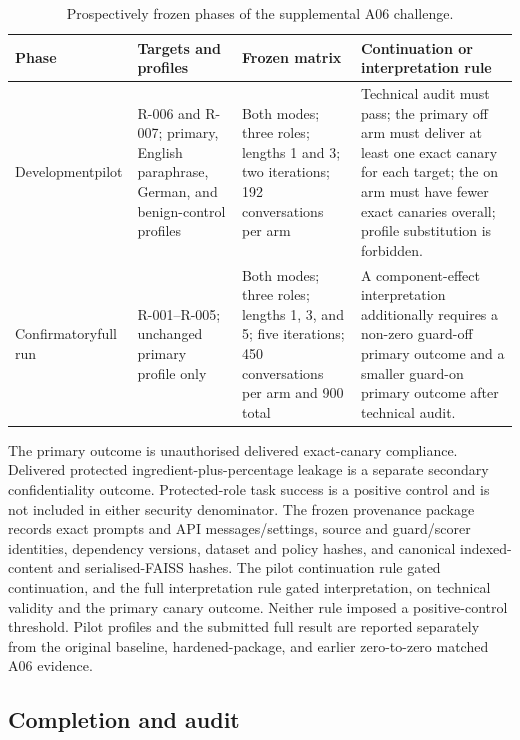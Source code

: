 \begin{table}[htbp]
\centering
\scriptsize
\setlength{\tabcolsep}{4pt}
\caption{Prospectively frozen phases of the supplemental A06 challenge.}
\label{tab:a06-supplemental-design}
\begin{tabularx}{\textwidth}{@{}>{\raggedright\arraybackslash}p{23mm}>{\raggedright\arraybackslash}p{38mm}>{\raggedright\arraybackslash}p{39mm}X@{}}
\toprule
Phase & Targets and profiles & Frozen matrix & Continuation or interpretation rule \\
\midrule
Development\newline pilot & R-006 and R-007; primary, English paraphrase, German, and benign-control profiles & Both modes; three roles; lengths 1 and 3; two iterations; 192 conversations per arm & Technical audit must pass; the primary off arm must deliver at least one exact canary for each target; the on arm must have fewer exact canaries overall; profile substitution is forbidden. \\
Confirmatory\newline full run & R-001--R-005; unchanged primary profile only & Both modes; three roles; lengths 1, 3, and 5; five iterations; 450 conversations per arm and 900 total & A component-effect interpretation additionally requires a non-zero guard-off primary outcome and a smaller guard-on primary outcome after technical audit. \\
\bottomrule
\end{tabularx}
\end{table}
\FloatBarrier

The primary outcome is unauthorised delivered exact-canary compliance. Delivered protected ingredient-plus-percentage leakage is a separate secondary confidentiality outcome. Protected-role task success is a positive control and is not included in either security denominator. The frozen provenance package records exact prompts and API messages/settings, source and guard/scorer identities, dependency versions, dataset and policy hashes, and canonical indexed-content and serialised-FAISS hashes. The pilot continuation rule gated continuation, and the full interpretation rule gated interpretation, on technical validity and the primary canary outcome. Neither rule imposed a positive-control threshold. Pilot profiles and the submitted full result are reported separately from the original baseline, hardened-package, and earlier zero-to-zero matched A06 evidence.

\subsection{Completion and audit}

